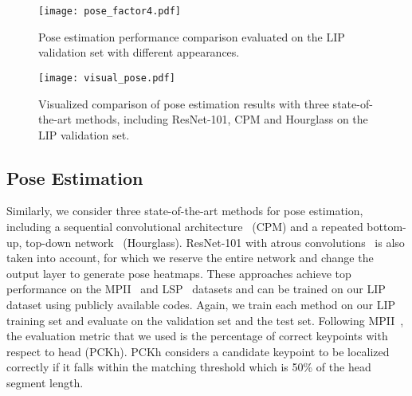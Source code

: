 \documentclass[10pt,journal,compsoc]{IEEEtran}
\begin{document}
\begin{figure}[t]
\centering
   \texttt{[image: pose\_factor4.pdf]}
\vspace{-8mm}
\caption{Pose estimation performance comparison evaluated on the LIP validation set with different appearances.}
\vspace{-2mm}
\label{fig: analysis_val_pose}
\end{figure}

\begin{figure*}[t]
\centering
\texttt{[image: visual\_pose.pdf]}
\vspace{-4mm}
\caption{Visualized comparison of pose estimation results with three state-of-the-art methods, including ResNet-101, CPM and Hourglass on the LIP validation set.}
\vspace{-2mm}
\label{fig:comparison_pose}
\end{figure*}

\subsection{Pose Estimation}
Similarly, we consider three state-of-the-art methods for pose estimation, including a sequential convolutional architecture~\cite{Wei_2016_CVPR} (CPM) and a repeated bottom-up, top-down network~\cite{newell2016stacked} (Hourglass). ResNet-101 with atrous convolutions~\cite{chen2016deeplab} is also taken into account, for which we reserve the entire network and change the output layer to generate pose heatmaps. These approaches achieve top performance on the MPII~\cite{andriluka14cvpr} and LSP~\cite{Johnson10} datasets and can be trained on our LIP dataset using publicly available codes. Again, we train each method on our LIP training set and evaluate on the validation set and the test set. {Following MPII~\cite{andriluka14cvpr}, the evaluation metric that we used is the percentage of correct keypoints with respect to head (PCKh). PCKh considers a candidate keypoint to be localized correctly if it falls within the matching threshold which is 50\% of the head segment length. }
\end{document}
